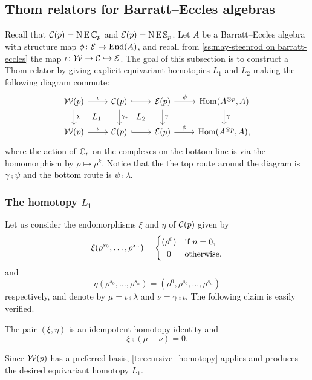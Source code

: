 \subsection{Thom relators for Barratt--Eccles algebras}

Recall that $\mathcal{C}(p) = \operatorname{N}\operatorname{E} \mathbb{C}_p$ and $\mathcal{E}(p) = \operatorname{N}\operatorname{E} \mathbb{S}_p$.
Let $A$ be a Barratt--Eccles algebra with structure map $\phi \colon \mathcal{E} \to \mathrm{End}(A)$, and recall from \cref{ss:may-steenrod on barratt-eccles} the map $\iota \colon \mathcal{W} \to \mathcal{C} \hookrightarrow \mathcal{E}$.
The goal of this subsection is to construct a Thom relator by giving explicit equivariant homotopies $L_1$ and $L_2$ making the following diagram commute:
\[
\begin{tikzcd}
	\cW(p) \arrow[r, "\iota"] \arrow[d,"\lambda"] \arrow[dr,phantom,"L_1"] &
	\cC(p) \arrow[r, hook] \arrow[d, "\gamma_\ast"] \arrow[dr,phantom,"L_2"] &
	\BE(p) \arrow[r,"\phi"] \arrow[d,"\gamma"] &
	\Hom(A^{\ot p}, A) \arrow[d,"\gamma"] \\
	\cW(p) \arrow[r, "\iota"] &
	\cC(p) \arrow[r, hook] &
	\BE(p) \arrow[r,"\phi"] &
	\Hom(A^{\ot p}, A),
\end{tikzcd}
\]
where the action of $\mathbb{C}_r$ on the complexes on the bottom line is via the homomorphism by $\rho \mapsto \rho^k$.
Notice that the the top route around the diagram is $\gamma \comp \psi$ and the bottom route is $\psi \comp \lambda$.

\subsubsection{The homotopy $L_1$}

Let us consider the endomorphisms $\xi$ and $\eta$ of $\mathcal{C}(p)$ given by
\[
\xi(\rho^{s_0},\dots,\rho^{s_n}) =
\begin{cases}
	(\rho^0) & \text{if } n = 0, \\
	\hfil0 & \text{otherwise}.
\end{cases}
\]
and
\[
\eta(\rho^{s_0},\dots,\rho^{s_n}) = (\rho^0,\rho^{s_0},\dots,\rho^{s_n})
\]
respectively, and denote by $\mu = \iota \comp \lambda$ and $\nu = \gamma \comp \iota$.
The following claim is easily verified.

\begin{lemma}
	The pair $(\xi,\eta)$ is an idempotent homotopy identity and
	\[
	\xi \comp (\mu - \nu) = 0.
	\]
\end{lemma}
Since $\mathcal{W}(p)$ has a preferred basis, \cref{t:recursive_homotopy} applies and produces the desired equivariant homotopy $L_1$.

